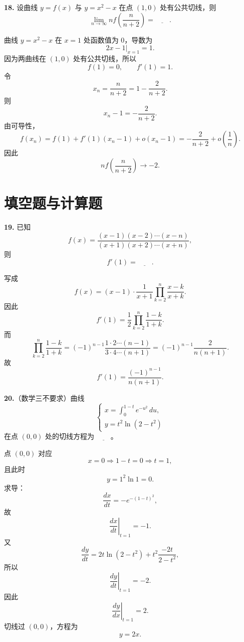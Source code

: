 \begin{problemblock}
\textbf{18.} 设曲线 \(y=f(x)\) 与 \(y=x^2-x\) 在点 \((1,0)\) 处有公共切线，则
\[
\lim_{n\to\infty}n f\left(\frac{n}{n+2}\right)=\underline{\qquad}.
\]
\end{problemblock}

\begin{solutionblock}
曲线 \(y=x^2-x\) 在 \(x=1\) 处函数值为 0，导数为
\[
2x-1\big|_{x=1}=1.
\]
因为两曲线在 \((1,0)\) 处有公共切线，所以
\[
f(1)=0,\qquad f'(1)=1.
\]
令
\[
x_n=\frac{n}{n+2}=1-\frac{2}{n+2}.
\]
则
\[
x_n-1=-\frac{2}{n+2}.
\]
由可导性，
\[
f(x_n)=f(1)+f'(1)(x_n-1)+o(x_n-1)
=-\frac{2}{n+2}+o\left(\frac1n\right).
\]
因此
\[
n f\left(\frac{n}{n+2}\right)\to -2.
\]
\end{solutionblock}

\section{填空题与计算题}

\begin{problemblock}
\textbf{19.} 已知
\[
f(x)=\frac{(x-1)(x-2)\cdots(x-n)}{(x+1)(x+2)\cdots(x+n)},
\]
则
\[
f'(1)=\underline{\qquad}.
\]
\end{problemblock}

\begin{solutionblock}
写成
\[
f(x)=(x-1)\cdot \frac1{x+1}\prod_{k=2}^n\frac{x-k}{x+k}.
\]
因此
\[
f'(1)=\frac12\prod_{k=2}^n\frac{1-k}{1+k}.
\]
而
\[
\prod_{k=2}^n\frac{1-k}{1+k}
=(-1)^{n-1}\frac{1\cdot2\cdots(n-1)}{3\cdot4\cdots(n+1)}
=(-1)^{n-1}\frac{2}{n(n+1)}.
\]
故
\[
f'(1)=\frac{(-1)^{n-1}}{n(n+1)}.
\]
\end{solutionblock}

\begin{problemblock}
\textbf{20.}（数学三不要求）曲线
\[
\begin{cases}
x=\displaystyle\int_0^{1-t}e^{-u^2}\,du,\\
y=t^2\ln(2-t^2)
\end{cases}
\]
在点 \((0,0)\) 处的切线方程为 \(\underline{\qquad}\)。
\end{problemblock}

\begin{solutionblock}
点 \((0,0)\) 对应
\[
x=0\Rightarrow 1-t=0\Rightarrow t=1,
\]
且此时
\[
y=1^2\ln1=0.
\]
求导：
\[
\frac{dx}{dt}=-e^{-(1-t)^2},
\]
故
\[
\left.\frac{dx}{dt}\right|_{t=1}=-1.
\]
又
\[
\frac{dy}{dt}=2t\ln(2-t^2)+t^2\frac{-2t}{2-t^2},
\]
所以
\[
\left.\frac{dy}{dt}\right|_{t=1}=-2.
\]
因此
\[
\left.\frac{dy}{dx}\right|_{t=1}=2.
\]
切线过 \((0,0)\)，方程为
\[
y=2x.
\]
\end{solutionblock}

